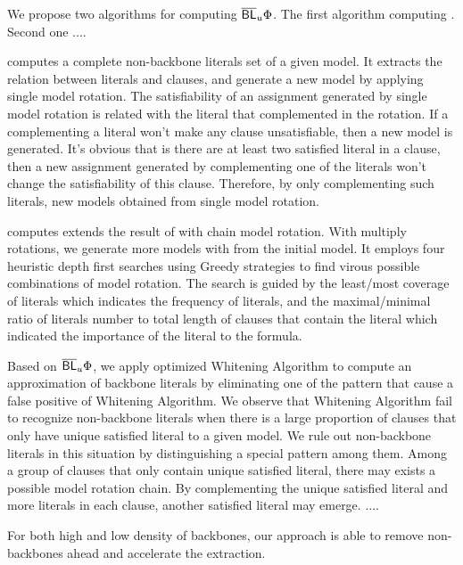 We propose two algorithms for computing $\overline{\textsf{BL}}_u{\Phi}$. The first algorithm computing \MBNB.
Second one \HBNB....

\MBNB computes a complete non-backbone literals set of a given model. 
It extracts the relation between literals and clauses, and generate a new model by applying single model rotation.
The satisfiability of an assignment generated by single model rotation is related with the literal that complemented in the rotation. If a complementing a literal won't make any clause unsatisfiable, then a new model is generated. It's obvious that is there are at least two satisfied literal in a clause, then a new assignment generated by complementing one of the literals won't change the satisfiability of this clause. Therefore, by only complementing such literals, new models obtained from single model rotation.

\HBNB computes extends the result of \MBNB with chain model rotation. With multiply rotations, we generate more models with from the initial model. It employs four heuristic depth first searches using Greedy strategies to find virous possible combinations of model rotation. The search is guided by the least/most coverage of literals which indicates the frequency of literals, and the maximal/minimal ratio of literals number to total length of clauses that contain the literal which indicated the importance of the literal to the formula.

\medskip
Based on $\overline{\textsf{BL}}_u{\Phi}$, we apply optimized Whitening Algorithm to compute an approximation of backbone literals by eliminating one of the pattern that cause a false positive of Whitening Algorithm.
We observe that Whitening Algorithm fail to recognize non-backbone literals when there is a large proportion of clauses that only have unique satisfied literal to a given model. We rule out non-backbone literals in this situation by distinguishing a special pattern among them. Among a group of clauses that only contain unique satisfied literal, there may exists a possible model rotation chain. By complementing the unique satisfied literal and more literals in each clause, another satisfied literal may emerge.
....

For both high and low density of backbones, our approach is able to remove non-backbones ahead and accelerate the extraction.

